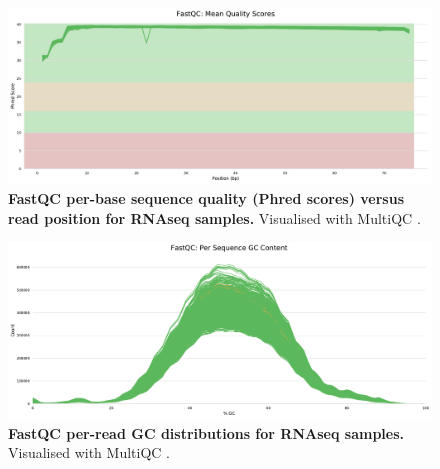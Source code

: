 \begin{figure}
	\centering
	\includegraphics[width=\textwidth]{mainmatter/figures/chapter_02/graphics_firstYearReport/fastqc/mqc_fastqc_per_base_sequence_quality_plot_1.pdf}
    \caption{
        \textbf{FastQC per-base sequence quality (Phred scores) versus read position for \gls{RNAseq} samples.}
        Visualised with MultiQC \autocite{ewels2016MultiQCSummarizeAnalysis}.
    }
	\label{fig:hird_fastqc_seqQual}
\end{figure}


\begin{figure}
	\centering
	\includegraphics[width=\textwidth]{mainmatter/figures/chapter_02/graphics_firstYearReport/fastqc/mqc_fastqc_per_sequence_gc_content_plot_Counts.pdf}
    \caption{
        \textbf{FastQC per-read GC distributions for \gls{RNAseq} samples.}
        Visualised with MultiQC \autocite{ewels2016MultiQCSummarizeAnalysis}.
}
	\label{fig:fastqc_gc}
\end{figure}

